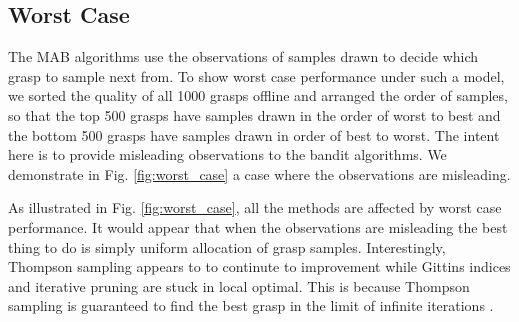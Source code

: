 \documentclass[10pt, conference]{ieeeconf}      %
\begin{document}
\subsection{Worst Case}
The MAB algorithms use the observations of samples drawn to decide which grasp to sample next from. To show worst case performance under such a model, we sorted the quality of all 1000 grasps offline and arranged the order of samples, so that the top 500 grasps have samples drawn in the order of worst to best and the bottom 500 grasps have samples drawn in order of best to worst. The intent here is to provide misleading observations to the bandit algorithms. We demonstrate in Fig. \ref{fig:worst_case} a case where the observations are misleading. 

As illustrated in Fig. \ref{fig:worst_case}, all the methods are affected by worst case performance. It would appear that when the observations are misleading the best thing to do is simply uniform allocation of grasp samples. Interestingly, Thompson sampling appears to to continute to improvement while Gittins indices and iterative pruning are stuck in local optimal. This is because Thompson sampling is guaranteed to find the best grasp in the limit of infinite iterations \cite{agrawal2011analysis}.
\end{document}
